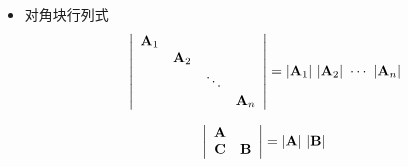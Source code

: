 \begin{frame}
  \begin{footnotesize}
    \begin{itemize}
    \item 对角块行列式
      $$
      \left|
      \begin{array}{cccc}
      \mathbf{A}_{1}&&&\\
      &\mathbf{A}_{2}&&\\
      &&\ddots&\\
      &&&\mathbf{A}_{n}        
      \end{array}
      \right|      
      =|\mathbf{A}_{1}|~|\mathbf{A}_{2}|~\cdots~|\mathbf{A}_{n}|
      $$      

      $$
      \left|
      \begin{array}{cc}
        \mathbf{A}&\\
        \mathbf{C}&\mathbf{B}
      \end{array}
      \right|=|\mathbf{A}|~|\mathbf{B}|
      $$
    \end{itemize}
  \end{footnotesize}
\end{frame}


